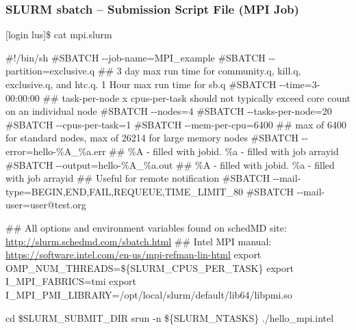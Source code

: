 \documentclass[t,hyperref={pdfpagelabels=false}]{beamer}
\newcommand{\ddash}{-{}-}
\begin{document}
\begin{frame}[fragile]
\frametitle{SLURM sbatch -- Submission Script File (MPI Job)}
\begin{semiverbatim}\tiny
[login lus]\$ cat mpi.slurm

\#!/bin/sh
\#SBATCH \ddash{}job-name=MPI\_example
\#SBATCH \ddash{}partition=exclusive.q
\#\# 3 day max run time for community.q, kill.q, exclusive.q, and htc.q.  1 Hour max run time for sb.q
\#SBATCH \ddash{}time=3-00:00:00 
\#\# task-per-node x cpus-per-task should not typically exceed core count on an individual node 
\#SBATCH \ddash{}nodes=4
\#SBATCH \ddash{}tasks-per-node=20
\#SBATCH \ddash{}cpus-per-task=1
\#SBATCH \ddash{}mem-per-cpu=6400 \#\# max of 6400 for standard nodes, max of 26214 for large memory nodes                                                                                                                                             
\#SBATCH \ddash{}error=hello-\%A\_\%a.err \#\# \%A - filled with jobid. \%a - filled with job arrayid
\#SBATCH \ddash{}output=hello-\%A\_\%a.out \#\# \%A - filled with jobid. \%a - filled with job arrayid
\#\# Useful for remote notification
\#SBATCH \ddash{}mail-type=BEGIN,END,FAIL,REQUEUE,TIME\_LIMIT\_80
\#SBATCH \ddash{}mail-user=user@test.org

\#\# All options and environment variables found on schedMD site: \href{http://slurm.schedmd.com/sbatch.html}{http://slurm.schedmd.com/sbatch.html}
\#\# Intel MPI manual: \href{https://software.intel.com/en-us/mpi-refman-lin-html}{https://software.intel.com/en-us/mpi-refman-lin-html}
export OMP\_NUM\_THREADS=\$\{SLURM\_CPUS\_PER\_TASK\}
export I\_MPI\_FABRICS=tmi  
export I\_MPI\_PMI\_LIBRARY=/opt/local/slurm/default/lib64/libpmi.so

cd \$SLURM\_SUBMIT\_DIR
srun  -n \$\{SLURM\_NTASKS\}  ./hello\_mpi.intel 
\end{semiverbatim}
\end{frame}
\end{document}
